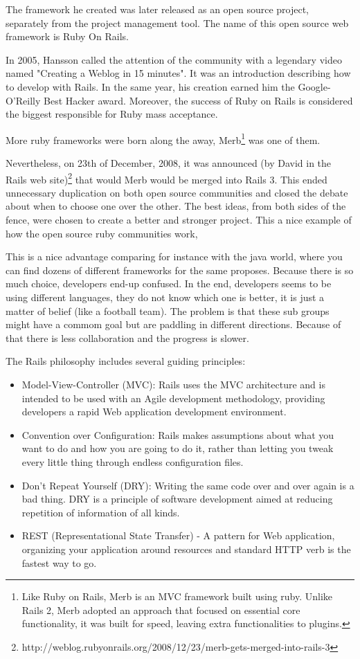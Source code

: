 The framework he created was later released as an open source project, separately from the project management tool. 
The name of this open source web framework is Ruby On Rails.

In 2005, Hansson called the attention of the community with a legendary video named "Creating a Weblog in 15 minutes". 
It was an introduction describing how to develop with Rails.
In the same year, his creation earned him the Google-O'Reilly Best Hacker award.
Moreover, the success of Ruby on Rails is considered the biggest responsible for Ruby mass acceptance.

More ruby frameworks were born along the away, 
\textsf{Merb}\footnote{
 Like Ruby on Rails, Merb is an MVC framework built using ruby.
 Unlike Rails 2, Merb adopted an approach that focused on essential core functionality, 
 it was built for speed, leaving extra functionalities to plugins.
}
was one of them.

Nevertheless, on 23th of December, 2008, it was announced
\textsf{(by David in the Rails web site)}\footnote{
 http://weblog.rubyonrails.org/2008/12/23/merb-gets-merged-into-rails-3
}
that
would Merb would be merged into Rails 3.
This ended unnecessary duplication on both open source communities 
and closed the debate about when to choose one over the other.
The best ideas, from both sides of the fence, were chosen to create a better and stronger project.
This a nice example of how the open source ruby communities work, 

This is a nice advantage comparing for instance with the java world, 
where you can find dozens of different frameworks for the same proposes.
Because there is so much choice, developers end-up confused.
In the end, developers seems to be using different languages,
they do not know which one is better, it is just a matter of belief (like a football team).
The problem is that these sub groups might have a commom goal but
are paddling in different directions.
Because of that there is less collaboration and the progress is slower.

The Rails philosophy includes several guiding principles:
\begin{itemize}
\item Model-View-Controller (MVC): Rails uses the MVC architecture and 
      is intended to be used with an Agile development methodology,
      providing developers a rapid Web application development environment.
\item Convention over Configuration: Rails makes assumptions about 
      what you want to do and how you are going to do it, 
      rather than letting you tweak every little thing through endless configuration files.
\item Don’t Repeat Yourself (DRY): Writing the same code over and over again is a bad thing. 
      DRY is a principle of software development aimed at reducing repetition of information of all kinds.
\item REST (Representational State Transfer) - A pattern for Web application, 
      organizing your application around resources and standard HTTP verb is the fastest way to go.
\end{itemize}



